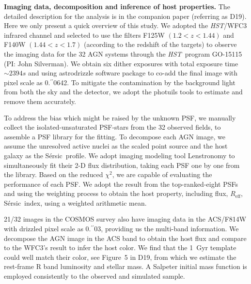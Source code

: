 \documentclass{natureprintstyle}
\newcommand{\hst}{{\it HST}}
\newcommand{\lhost}{$L_{\rm host}$}
\newcommand{\sersic}{S\'ersic}
\newcommand{\lenstronomy}{{\sc Lenstronomy}}
\newcommand{\reff}{{$R_{\mathrm{eff}}$}}
\newcommand{\mstar}{{$M_*$}}
\newcommand{\farcs}{\mbox{\ensuremath{.\!\!^{\prime\prime}}}}%
\begin{document}
\textbf{Imaging data, decomposition and inference of host properties.} 
The detailed description for the analysis is in the companion paper (referring as D19). Here we only present a quick overview of this study. We adopted the \hst/WFC3 infrared channel and selected to use the filters F125W $(1.2<z<1.44)$ and F140W $(1.44<z<1.7)$ (according to the redshift of the targets) to observe the imaging data for the 32 AGN systems through the \hst\ program GO-15115 (PI: John Silverman). We obtain six dither exposures with total exposure time $\sim2394s$ and using  {\sc astrodrizzle} software package to co-add the final image with pixel scale as 0\farcs0642. To mitigate the contamination by the background light from both the sky and the detector, we adopt the {\sc photuils} tools to estimate and remove them accurately.

To address the bias which might be raised by the unknown PSF, we manually collect the isolated-unsaturated PSF-stars from the 32 observed fields, to assemble a PSF library for the fitting. To decompose each AGN image, we assume the unresolved active nuclei as the scaled point source and the host galaxy as the \sersic\ profile. We adopt imaging modeling tool \lenstronomy\cite{lenstronomy} to simultaneously fit their 2-D flux distribution, taking each PSF one by one from the library. Based on the reduced $\chi^2$, we are capable of evaluating the performance of each PSF. We adopt the result from the top-ranked-eight PSFs and using the weighting process to obtain the host property, including flux, \reff, \sersic\ index, using a weighted arithmetic mean.

21/32 images in the COSMOS survey also have imaging data in the ACS/F814W with drizzled pixel scale as 0\farcs03, providing us the multi-band information. We decompose the AGN image in the ACS band to obtain the host flux and compare to the WFC3's result to infer the host color. We find that the 1~Gyr template could well match their color, see Figure~5 in D19, from which we estimate the rest-frame R band luminosity and stellar mass. A Salpeter initial mass function is employed consistently to the observed and simulated sample.

\end{document}
